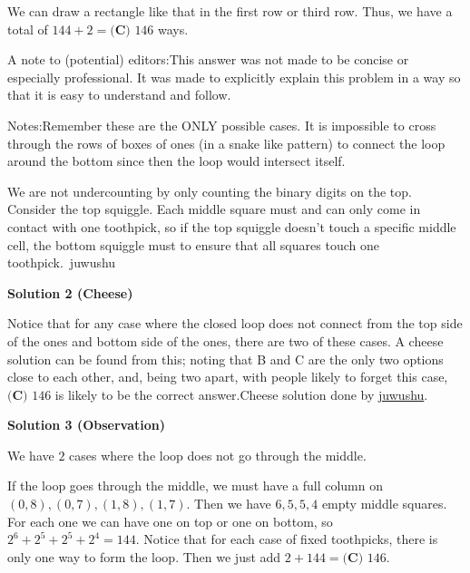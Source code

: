 \begin{enumerate}
 We can draw a rectangle like that in the first row or third row. Thus, we have a total of $144+2=\boxed{\textbf{(C) }146}$ ways.

 
A note to (potential) editors:This answer was not made to be concise or especially professional. It was made to explicitly explain this problem in a way so that it is easy to understand and follow.

 Notes:Remember these are the ONLY possible cases. It is impossible to cross through the rows of boxes of ones (in a snake like pattern) to connect the loop around the bottom since then the loop would intersect itself. 

 We are not undercounting by only counting the binary digits on the top. Consider the top squiggle. Each middle square must and can only come in contact with one toothpick, so if the top squiggle doesn't touch a specific middle cell, the bottom squiggle must to ensure that all squares touch one toothpick.~juwushu

 



\textbf{Solution 2 (Cheese)}

Notice that for any case where the closed loop does not connect from the top side of the ones and bottom side of the ones, there are two of these cases. A cheese solution can be found from this; noting that B and C are the only two options close to each other, and, being two apart, with people likely to forget this case, $\boxed{\textbf{(C) }146}$ is likely to be the correct answer.Cheese solution done by \href{https://artofproblemsolving.com/wiki/index.php?title=User:Juwushu}{juwushu}.

 



\textbf{Solution 3 (Observation)}

We have $2$ cases where the loop does not go through the middle. 

 If the loop goes through the middle, we must have a full column on $(0,8),(0,7),(1,8),(1,7).$ Then we have $6,5,5,4$ empty middle squares. For each one we can have one on top or one on bottom, so $2^6+2^5+2^5+2^4=144.$ Notice that for each case of fixed toothpicks, there is only one way to form the loop. Then we just add $2+144=\boxed{\textbf{(C) } 146.}$



\end{enumerate}